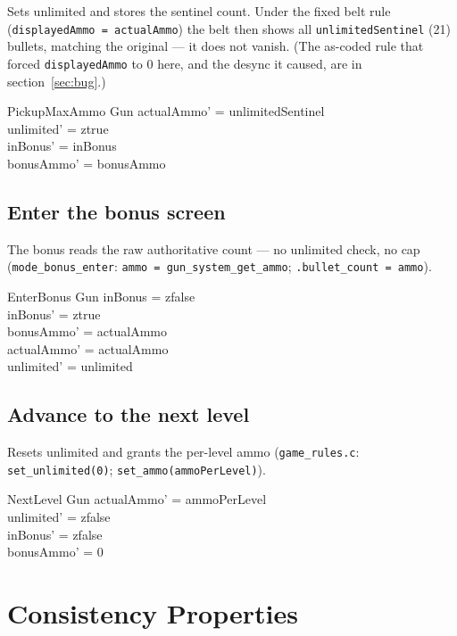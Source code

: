\documentclass[a4paper,10pt,fleqn]{article}
\begin{document}
Sets unlimited and stores the sentinel count.  Under the fixed belt rule
(\texttt{displayedAmmo = actualAmmo}) the belt then shows all
\texttt{unlimitedSentinel} (21) bullets, matching the original --- it does
not vanish.  (The as-coded rule that forced \texttt{displayedAmmo} to 0
here, and the desync it caused, are in section~\ref{sec:bug}.)

\begin{schema}{PickupMaxAmmo}
\Delta Gun
\where
actualAmmo' = unlimitedSentinel \\
unlimited' = ztrue \\
inBonus' = inBonus \\
bonusAmmo' = bonusAmmo
\end{schema}

\subsection{Enter the bonus screen}

The bonus reads the raw authoritative count --- no unlimited check, no
cap (\texttt{mode\_bonus\_enter}: \texttt{ammo = gun\_system\_get\_ammo};
\texttt{.bullet\_count = ammo}).

\begin{schema}{EnterBonus}
\Delta Gun
\where
inBonus = zfalse \\
inBonus' = ztrue \\
bonusAmmo' = actualAmmo \\
actualAmmo' = actualAmmo \\
unlimited' = unlimited
\end{schema}

\subsection{Advance to the next level}

Resets unlimited and grants the per-level ammo
(\texttt{game\_rules.c}: \texttt{set\_unlimited(0)};
\texttt{set\_ammo(ammoPerLevel)}).

\begin{schema}{NextLevel}
\Delta Gun
\where
actualAmmo' = ammoPerLevel \\
unlimited' = zfalse \\
inBonus' = zfalse \\
bonusAmmo' = 0
\end{schema}

\section{Consistency Properties}
\end{document}
